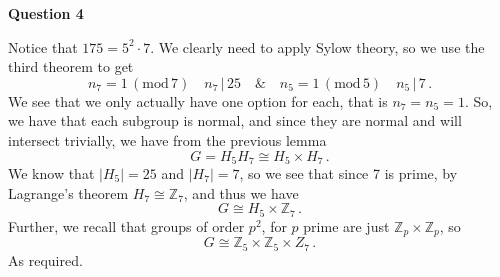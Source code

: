 \documentclass[10pt]{article}
\newcommand{\Z}{\mathbb{Z}}
\begin{document}
\newpage
\textbf{Question 4}

Notice that $175 = 5^{2}\cdot 7$. We clearly need to apply Sylow theory, so we use the third theorem to get
\[ n_{7} = 1 \, (\text{mod}\, 7) \quad n_{7}\, | \, 25 \quad \& \quad n_{5} = 1 \, (\text{mod} \, 5) \quad n_{5} \, |\, 7 \, .\]
We see that we only actually have one option for each, that is $n_{7} = n_{5} = 1$. So, we have that each subgroup is normal, and since they are normal and will intersect trivially, we have from the previous lemma
\[ G = H_{5}H_{7} \cong H_{5}\times H_{7} \, .\]
We know that $|H_{5}| = 25$ and $|H_{7}| = 7$, so we see that since 7 is prime, by Lagrange's theorem $H_{7} \cong \Z_{7}$, and thus we have 
\[ G \cong H_{5} \times \Z_{7} \, .\]
Further, we recall that groups of order $p^{2}$, for $p$ prime are just $\Z_{p}\times\Z_{p}$, so
\[ G\cong \Z_{5}\times \Z_{5}\times Z_{7} \, .\]
As required.
\end{document}

